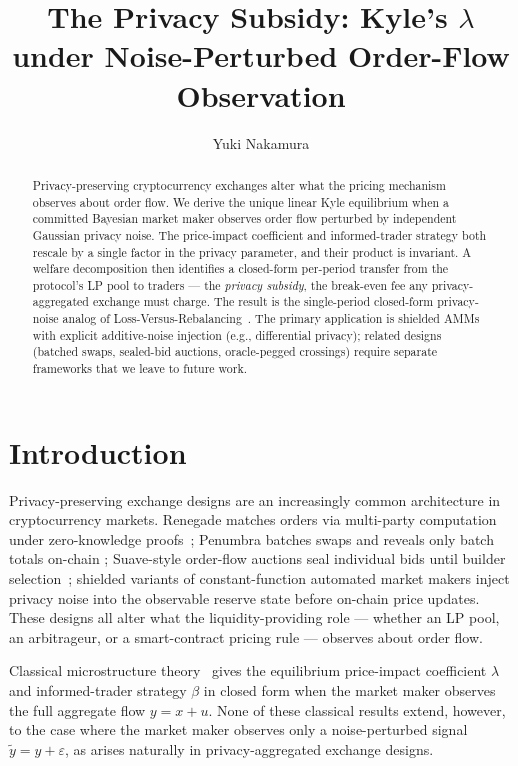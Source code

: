 \documentclass[runningheads]{llncs}
\title{The Privacy Subsidy: Kyle's $\lambda$ under Noise-Perturbed
Order-Flow Observation}
\author{Yuki Nakamura\orcidID{0009-0001-7174-6737}}
\institute{The Open University of Japan}
\newcommand{\ytil}{\tilde y}
\begin{document}
\maketitle

\begin{abstract}
\begin{sloppypar}
Privacy-preserving cryptocurrency exchanges alter what the
pricing mechanism observes about order flow. We derive the unique
linear Kyle equilibrium when a committed Bayesian market maker
observes order flow perturbed by independent Gaussian privacy
noise. The price-impact coefficient and informed-trader strategy
both rescale by a single factor in the privacy parameter, and their
product is invariant. A welfare decomposition then identifies a
closed-form per-period transfer from the protocol's LP pool to
traders --- the \emph{privacy subsidy}, the break-even fee any
privacy-aggregated exchange must charge. The result is the
single-period closed-form privacy-noise analog of
Loss-Versus-Rebalancing~\cite{milionis2022lvr}. The primary
application is shielded AMMs with explicit additive-noise
injection (e.g., differential privacy); related designs
(batched swaps, sealed-bid auctions, oracle-pegged crossings)
require separate frameworks that we leave to future work.
\end{sloppypar}

\end{abstract}

\section{Introduction}
\label{sec:intro}

Privacy-preserving exchange designs are an increasingly common
architecture in cryptocurrency markets. Renegade matches orders via
multi-party computation under zero-knowledge proofs~\cite{renegade-wp};
Penumbra batches swaps and reveals only batch totals on-chain
\cite{penumbra-docs}; Suave-style order-flow auctions seal
individual bids until builder selection~\cite{flashbots-suave};
shielded variants of constant-function automated market makers
inject privacy noise into the observable reserve state before
on-chain price updates. These designs all alter what the
liquidity-providing role --- whether an LP pool, an arbitrageur, or
a smart-contract pricing rule --- observes about order flow.

Classical microstructure theory~\cite{kyle1985} gives the
equilibrium price-impact coefficient $\lambda$ and informed-trader
strategy $\beta$ in closed form when the market maker observes the
full aggregate flow $y = x + u$. None of these classical results
extend, however, to the case where the market maker observes only
a noise-perturbed signal $\ytil = y + \varepsilon$, as arises
naturally in privacy-aggregated exchange designs.
\end{document}

